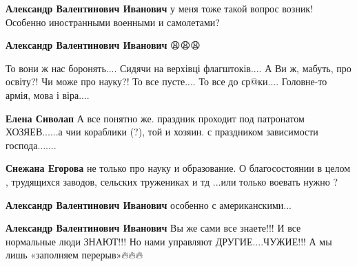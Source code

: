 \begin{itemize}
\begin{itemize}
\textbf{Александр Валентинович Иванович} у меня тоже такой вопрос возник! Особенно иностранными военными и самолетами?


 
\textbf{Александр Валентинович Иванович} 😩😩😩

\obeycr
То вони ж нас боронять....
Сидячи на верхівці флагштоків....
А Ви ж, мабуть, про освіту?!
Чи може про науку?!
То все пусте....
То все до ср@ки....
Головне-то армія, мова і віра....
\restorecr


 
\textbf{Елена Сиволап} А все понятно же. праздник проходит под патронатом ХОЗЯЕВ......а чии кораблики (?), той и хозяин. с праздником зависимости господа.......

 
\textbf{Снежана Егорова} не только про науку и образование. О благосостоянии в целом , трудящихся заводов, сельских тружениках и тд ...или только воевать нужно ?

 
\textbf{Александр Валентинович Иванович} особенно с американскими...🤔


 
\textbf{Александр Валентинович Иванович} Вы же сами все знаете!!!
И все нормальные люди ЗНАЮТ!!!
Но нами управляют ДРУГИЕ....ЧУЖИЕ!!!
А мы лишь «заполняем перерыв»🔥🔥🔥


\end{itemize}
\end{itemize}
